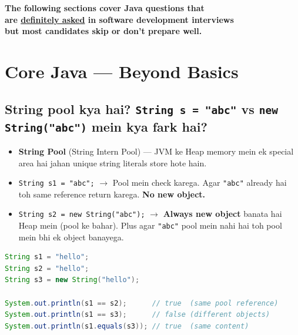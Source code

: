 \documentclass[12pt,a4paper]{article}
\begin{document}
\newpage

\begin{center}
\begin{tcolorbox}[colback=warnbox, colframe=orange!80!black, width=\textwidth]
\centering
\Large\bfseries The following sections cover Java questions that \\
are \underline{definitely asked} in software development interviews \\
but most candidates skip or don't prepare well.
\end{tcolorbox}
\end{center}

\section{Core Java --- Beyond Basics}

\setcounter{subsection}{37}

\subsection{String pool kya hai? \texttt{String s = "abc"} vs \texttt{new String("abc")} mein kya fark hai?}

\begin{answerbox}
\begin{itemize}
    \item \textbf{String Pool} (String Intern Pool) --- JVM ke Heap memory mein ek special area hai jahan unique string literals store hote hain.
    \item \texttt{String s1 = "abc";} $\rightarrow$ Pool mein check karega. Agar \texttt{"abc"} already hai toh same reference return karega. \textbf{No new object.}
    \item \texttt{String s2 = new String("abc");} $\rightarrow$ \textbf{Always new object} banata hai Heap mein (pool ke bahar). Plus agar \texttt{"abc"} pool mein nahi hai toh pool mein bhi ek object banayega.
\end{itemize}
\begin{lstlisting}[language=Java]
String s1 = "hello";
String s2 = "hello";
String s3 = new String("hello");

System.out.println(s1 == s2);      // true  (same pool reference)
System.out.println(s1 == s3);      // false (different objects)
System.out.println(s1.equals(s3)); // true  (same content)
\end{lstlisting}
\end{answerbox}
\end{document}
